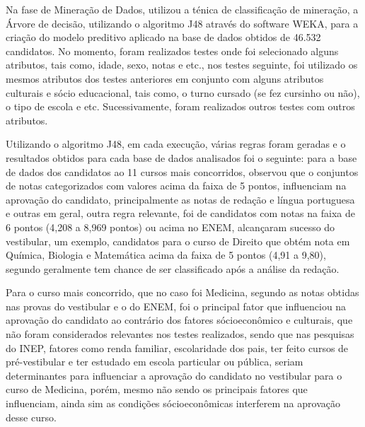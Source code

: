 \par
Na fase de Mineração de Dados,  utilizou a ténica de classificação de mineração, a Árvore de decisão, utilizando o algoritmo J48 através do software WEKA, para a criação do modelo preditivo aplicado na base de dados obtidos de 46.532 candidatos. No momento, foram realizados testes onde foi selecionado alguns atributos, tais como, idade, sexo, notas e etc., nos testes seguinte, foi utilizado os mesmos atributos dos testes anteriores em conjunto com alguns atributos culturais e sócio educacional, tais como, o turno cursado (se fez cursinho ou não), o tipo de escola e etc. Sucessivamente, foram realizados outros testes com outros atributos.

\par
Utilizando o algoritmo J48, em cada execução, várias regras foram geradas e o resultados obtidos para cada base de dados analisados foi o seguinte: para a base de dados dos candidatos ao 11 cursos mais concorridos,  observou que o conjuntos de notas categorizados com valores acima da faixa de 5 pontos, influenciam na aprovação do candidato, principalmente as notas de redação e língua portuguesa e outras em geral, outra regra relevante, foi de candidatos com notas na faixa de 6 pontos (4,208 a 8,969 pontos) ou acima no ENEM, alcançaram sucesso do vestibular, um exemplo, candidatos para o curso de Direito que obtém nota em Química, Biologia e Matemática acima da faixa de 5 pontos (4,91 a 9,80), segundo  geralmente tem chance de ser classificado após a análise da redação.

\par
Para o curso mais concorrido, que no caso foi Medicina, segundo  as notas obtidas nas provas do vestibular e o do ENEM, foi o principal fator que influenciou na aprovação do candidato ao contrário dos fatores sócioeconômico e culturais, que não foram considerados relevantes nos testes realizados, sendo que nas pesquisas do INEP, fatores como renda familiar, escolaridade dos pais, ter feito cursos de pré-vestibular e ter estudado em escola particular ou pública, seriam determinantes para influenciar a aprovação do candidato no vestibular para o curso de Medicina, porém, mesmo não sendo os principais fatores que influenciam, ainda sim as condições sócioeconômicas interferem na aprovação desse curso. 

